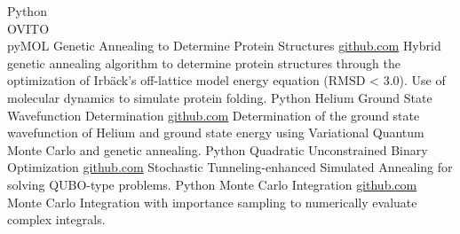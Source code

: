 \documentclass[9pt]{developercv} %
\begin{document}
\begin{entrylist}
    \entry
		{Python \\ OVITO \\ pyMOL }
		{Genetic Annealing to Determine Protein Structures}
		{\href{https://github.com/lonelyneutrin0/Protein-Structure-Prediction}{github.com}}
		{Hybrid genetic annealing algorithm to determine protein structures through the optimization of Irbäck's off-lattice model energy equation (RMSD < 3.0). Use of molecular dynamics to simulate protein folding.}
    \entry
		{Python}
		{Helium Ground State Wavefunction Determination}
		{\href{https://github.com/lonelyneutrin0/QMCGA}{github.com}}
		{Determination of the ground state wavefunction of Helium and ground state energy using Variational Quantum Monte Carlo and genetic annealing.}
	\entry
		{Python}
		{Quadratic Unconstrained Binary Optimization}
		{\href{https://github.com/lonelyneutrin0/qubo}{github.com}}
		{Stochastic Tunneling-enhanced Simulated Annealing for solving QUBO-type problems.}
		\entry
		{Python}
		{Monte Carlo Integration}
		{\href{https://github.com/lonelyneutrin0/MNI}{github.com}}
		{Monte Carlo Integration with importance sampling to numerically evaluate complex integrals.}
\end{entrylist}

\end{document}
